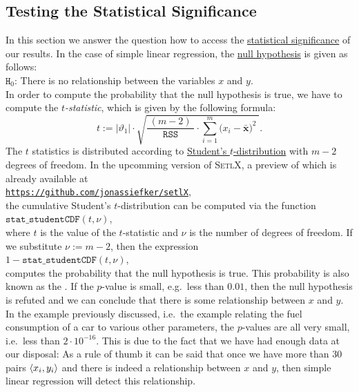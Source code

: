 \subsection{Testing the Statistical Significance}
In this section we answer the question how to access the 
\href{https://en.wikipedia.org/wiki/Statistical_significance}{statistical significance} of our
results.  In the case of simple linear regression, the
\href{https://en.wikipedia.org/wiki/Null_hypothesis}{null hypothesis} is given as follows: 
\\[0.2cm]
\hspace*{1.3cm}
$\mathtt{H}_0$: There is no relationship between the variables $x$ and $y$.
\\[0.2cm]
In order to compute the probability that the null hypothesis is true, we have to compute the
\emph{\color{blue} $t$-statistic}, which is given by the following formula:
\begin{equation}
  \label{eq:t-statistics}
  t := |\vartheta_1| \cdot \sqrt{\frac{\;(m-2)\;}{\mathtt{RSS}} \cdot \sum\limits_{i=1}^m \bigl(x_i - \bar{\mathbf{x}}\bigr)^2\; }.
\end{equation}
The $t$ statistics is distributed according to 
\href{https://en.wikipedia.org/wiki/Student%27s_t-distribution}{Student's $t$-distribution} 
with $m-2$ degrees of freedom.  In the upcomming version of \textsc{SetlX}, a preview of which is already available at
\\[0.2cm]
\hspace*{1.3cm}
\href{https://github.com/jonassiefker/setlX}{\texttt{https://github.com/jonassiefker/setlX}},
\\[0.2cm]
the cumulative Student's $t$-distribution can be computed
via the function
\\[0.2cm]
\hspace*{1.3cm}
$\mathtt{stat\_studentCDF}(t, \nu)$,
\\[0.2cm]
where $t$ is the value of the $t$-statistic and $\nu$ is the number of degrees of freedom.  If we substitute
$\nu := m - 2$, then the expression 
\\[0.2cm]
\hspace*{1.3cm}
$1 - \mathtt{stat\_studentCDF}(t, \nu)$,
\\[0.2cm]
 computes the probability that the null hypothesis is true.  This probability
is also known as the .  If the $p$-value is small, e.g.~less than $0.01$, then the null
hypothesis is refuted and we can conclude that there is some relationship between $x$ and $y$.  In the example
previously discussed, i.e.~the example relating the fuel consumption of a car to various other parameters, the
$p$-values are all very small, i.e.~less than $2 \cdot 10^{-16}$.  This is due to the fact that we have had enough data at
our disposal:  As a rule of thumb it can be said that once we have more than 30 pairs $\pair(x_i, y_i)$ and there
is indeed a relationship between $x$ and $y$, then simple linear regression will detect this relationship.

